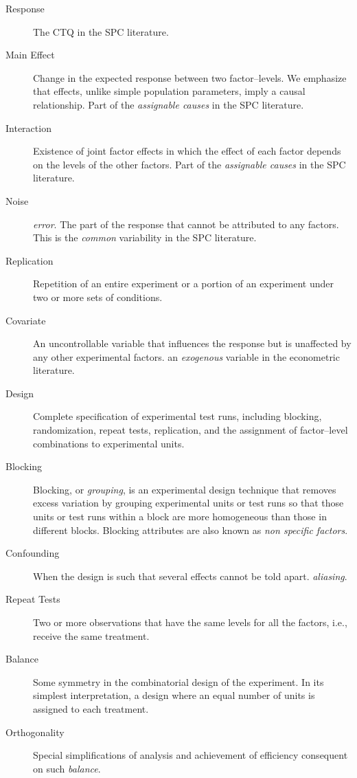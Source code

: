 \begin{description}
\item [Response] The CTQ in the SPC literature. 

\item [Main Effect] Change in the expected response between two factor–levels.  
We emphasize that effects, unlike simple population parameters, imply a causal relationship.
Part of the \emph{assignable causes} in the SPC literature.

\item [Interaction] Existence of joint factor effects in which the effect of each factor depends on the levels of the other factors.
Part of the \emph{assignable causes} in the SPC literature.

\item [Noise] \Aka \emph{error}. The part of the response that cannot be attributed to any factors.
This is the \emph{common} variability in the SPC literature.

\item [Replication] Repetition of an entire experiment or a portion of an experiment under two or more sets of conditions.

\item [Covariate]  An uncontrollable variable that influences the response but is unaffected by any other experimental factors.
\Aka an \emph{exogenous} variable in the econometric literature.

\item [Design]  Complete specification of experimental test runs, including blocking, randomization, repeat tests, replication, and the assignment of factor–level combinations to experimental units.

\item [Blocking]  Blocking, or \emph{grouping}, is an experimental design technique that removes excess variation by grouping experimental units or test runs so that those units or test runs within a block are more homogeneous than those in different blocks. Blocking attributes are also known as \emph{non specific factors}.

\item [Confounding] When the design is such that several effects cannot be told apart. \Aka \emph{aliasing}.

\item [Repeat Tests] Two or more observations that have the same levels for all the factors, i.e., receive the same treatment.

\item [Balance] Some symmetry in the combinatorial design of the experiment. In its simplest interpretation, a design where an equal number of units is assigned to each treatment.

\item [Orthogonality]  Special simplifications of analysis and achievement of efficiency consequent on such \emph{balance}.
\end{description}








